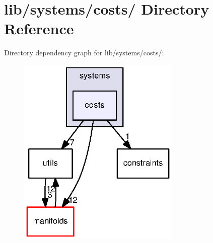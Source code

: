\section{lib/systems/costs/ \-Directory \-Reference}
\label{dir_3f7a34d4b8eb7a816ce0a2aa8dfd1908}
\-Directory dependency graph for lib/systems/costs/\-:
\nopagebreak
\begin{figure}[H]
\begin{center}
\leavevmode
\includegraphics[width=220pt]{dir_3f7a34d4b8eb7a816ce0a2aa8dfd1908_dep}
\end{center}
\end{figure}
